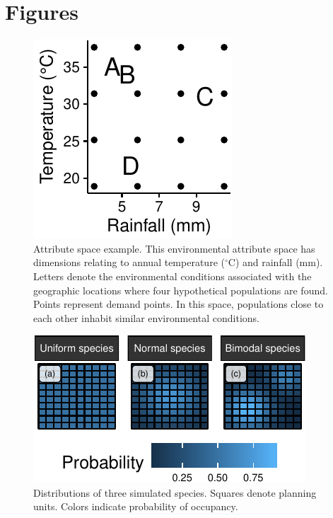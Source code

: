 \section{Figures}\label{figures}

\begin{figure}
\centering
\includegraphics{figures_files/figure-latex/unnamed-chunk-3-1.pdf}
\caption{Attribute space example. This environmental attribute space has
dimensions relating to annual temperature (\(^{\circ}\)C) and rainfall
(mm). Letters denote the environmental conditions associated with the
geographic locations where four hypothetical populations are found.
Points represent demand points. In this space, populations close to each
other inhabit similar environmental conditions.}
\end{figure}

\begin{figure}
\centering
\includegraphics{figures_files/figure-latex/unnamed-chunk-4-1.pdf}
\caption{Distributions of three simulated species. Squares denote
planning units. Colors indicate probability of occupancy.}
\end{figure}

